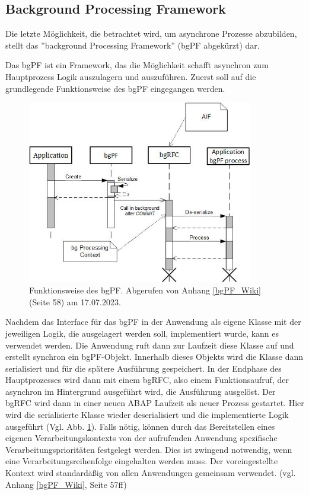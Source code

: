 \subsection{Background Processing Framework}

Die letzte Möglichkeit, die betrachtet wird, um asynchrone Prozesse abzubilden, stellt das ''background Processing Framework'' (bgPF abgekürzt) dar.

Das bgPF ist ein Framework, das die Möglichkeit schafft asynchron zum Hauptprozess Logik auszulagern und auszuführen. Zuerst soll auf die grundlegende Funktionsweise des bgPF eingegangen werden.

\begin{figure}[H]
 \centering
 \includegraphics[height=8cm]{Bilder/bgPF_Schema.png}
 \caption[Funktionsweise des bgPF]{Funktionsweise des bgPF. Abgerufen von Anhang \ref{bgPF_Wiki} (Seite 58) am 17.07.2023.}
 \label{fig:iso_norm_bgPF}
\end{figure}

Nachdem das Interface für das bgPF in der Anwendung als eigene Klasse mit der jeweiligen Logik, die ausgelagert werden soll, implementiert wurde, kann es verwendet werden. Die Anwendung ruft dann zur Laufzeit diese Klasse auf und erstellt synchron ein bgPF-Objekt. Innerhalb dieses Objekts wird die Klasse dann serialisiert und für die spätere Ausführung gespeichert. In der Endphase des Hauptprozesses wird dann mit einem bgRFC, also einem Funktionsaufruf, der asynchron im Hintergrund ausgeführt wird, die Ausführung ausgelöst. Der bgRFC wird dann in einer neuen ABAP Laufzeit als neuer Prozess gestartet. Hier wird die serialisierte Klasse wieder deserialisiert und die implementierte Logik ausgeführt (Vgl. Abb. \ref{fig:iso_norm_bgPF}). Falls nötig, können durch das Bereitstellen eines eigenen Verarbeitungskontexts von der aufrufenden Anwendung spezifische Verarbeitungsprioritäten festgelegt werden. Dies ist zwingend notwendig, wenn eine Verarbeitungsreihenfolge eingehalten werden muss. Der voreingestellte Kontext wird standardä{\ss}ig von allen Anwendungen gemeinsam verwendet. (vgl. Anhang \ref{bgPF_Wiki}, Seite 57ff)

